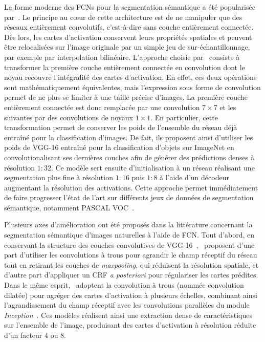 La forme moderne des \glspl{FCN} pour la segmentation sémantique a été popularisée par~\citet{long_fully_2015}. Le principe au c\oe{}ur de cette architecture est de ne manipuler que des réseaux entièrement convolutifs, c'est-à-dire sans couche entièrement connectée. Dès lors, les cartes d'activation conservent leurs propriétés spatiales et peuvent être relocalisées sur l'image originale par un simple jeu de sur-échantillonnage, par exemple par interpolation bilinéaire. L'approche choisie par~\citet{long_fully_2015} consiste à transformer la première couche entièrement connectée en convolution dont le noyau recouvre l'intégralité des cartes d'activation. En effet, ces deux opérations sont mathématiquement équivalentes, mais l'expression sous forme de convolution permet de ne plus se limiter à une taille précise d'images. La première couche entièrement connectée est donc remplacée par une convolution $7\times7$ et les suivantes par des convolutions de noyaux $1\times1$. En particulier, cette transformation permet de conserver les poids de l'ensemble du réseau déjà entraîné pour la classification d'images. De fait, ils proposent ainsi d'utiliser les poids de VGG-16 entraîné pour la classification d'objets sur ImageNet en convolutionalisant ses dernières couches afin de générer des prédictions denses à résolution $1:32$. Ce modèle sert ensuite d'initialisation à un réseau réalisant une segmentation plus fine à résolution $1:16$ puis $1:8$ à l'aide d'un décodeur augmentant la résolution des activations. Cette approche permet immédiatement de faire progresser l'état de l'art sur différents jeux de données de segmentation sémantique, notamment PASCAL VOC~\cite{everingham_pascal_2014}.

Plusieurs axes d'amélioration ont été proposés dans la littérature concernant la segmentation sémantique d'images naturelles à l'aide de \gls{FCN}. Tout d'abord, en conservant la structure des couches convolutives de VGG-16~\cite{simonyan_very_2014},~\citet{chen_deeplab_2018} proposent d'une part d'utiliser les convolutions à trous pour agrandir le champ réceptif du réseau tout en retirant les couches de \emph{maxpooling}, qui réduisent la résolution spatiale, et d'autre part d'appliquer un \gls{CRF} \emph{a posteriori} pour régulariser les cartes prédites. Dans le même esprit,~\citet{yu_multi-scale_2015} adoptent la convolution à trous (nommée convolution dilatée) pour agréger des cartes d'activation à plusieurs échelles, combinant ainsi l'agrandissement du champ réceptif avec les convolutions parallèles du module \emph{Inception}~\cite{szegedy_going_2015}. Ces modèles réalisent ainsi une extraction dense de caractéristiques sur l'ensemble de l'image, produisant des cartes d'activation à résolution réduite d'un facteur 4 ou 8.

